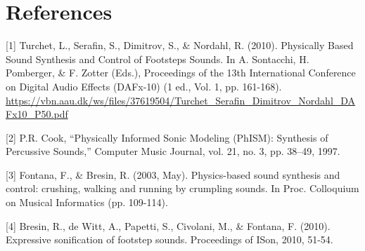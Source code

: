 \documentclass[11pt]{article}
\begin{document}
\section{References}
\label{sec:orgef4052e}

[1] Turchet, L., Serafin, S., Dimitrov, S., \& Nordahl, R. (2010). Physically Based Sound Synthesis and Control of
Footsteps Sounds. In A. Sontacchi, H. Pomberger, \& F. Zotter (Eds.), Proceedings of the 13th International
Conference on Digital Audio Effects (DAFx-10) (1 ed., Vol. 1, pp. 161-168).
\url{https://vbn.aau.dk/ws/files/37619504/Turchet\_Serafin\_Dimitrov\_Nordahl\_DAFx10\_P50.pdf}

[2] P.R. Cook, “Physically Informed Sonic Modeling (PhISM): Synthesis of Percussive Sounds,” Computer Music Journal, vol. 21, no. 3, pp. 38–49, 1997.

[3] Fontana, F., \& Bresin, R. (2003, May). Physics-based sound synthesis and control: crushing, walking and running by crumpling sounds. In Proc. Colloquium on Musical Informatics (pp. 109-114).

[4] Bresin, R., de Witt, A., Papetti, S., Civolani, M., \& Fontana, F. (2010). Expressive sonification of footstep sounds. Proceedings of ISon, 2010, 51-54.
\end{document}
